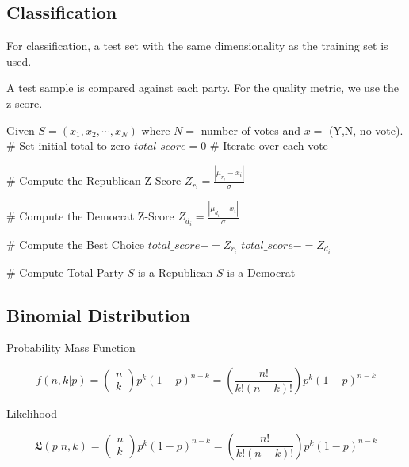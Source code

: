 \documentclass[12pt]{report}
\begin{document}
\clearpage
\subsection*{Classification}

For classification, a test set with the same dimensionality as the training set is used.

A test sample is compared against each party.  For the quality metric, we use the z-score.


\begin{algorithmic}
\State
\State Given $S = \left( x_1, x_2, \cdots, x_N \right)$ where $N = $ number of votes and $x = $ (Y,N, no-vote).
\State
\State \# Set initial total to zero
\State $total\_score = 0$
\State
\State \# Iterate over each vote
    
    \State
    \State \# Compute the Republican Z-Score
    \State $Z_{r_i} = \frac{\left|\mu_{r_i} - x_i\right|}{\sigma}$
    
    \State
    \State \# Compute the Democrat Z-Score
    \State $Z_{d_i} = \frac{\left|\mu_{d_i} - x_i\right|}{\sigma}$
    \State

    \State \# Compute the Best Choice
        \State $total\_score += Z_{r_i}$
    \Else
        \State $total\_score -= Z_{d_i}$
    \EndIf


\EndFor
\State
\State \# Compute Total Party
    \State $S$ is a Republican
\Else
    \State $S$ is a Democrat
\EndIf

\end{algorithmic}

\clearpage
\subsection*{Binomial Distribution}


Probability Mass Function

\begin{equation}
f(n,k | p) = \begin{pmatrix}
n\\k
\end{pmatrix} p^k (1-p)^{n-k} =\left( \frac{n!}{k!(n-k)!}\right) p^k (1-p)^{n-k}
\end{equation}

Likelihood

\begin{equation}
\mathfrak{L}(p|n,k) = \begin{pmatrix}
n\\k
\end{pmatrix} p^k (1-p)^{n-k} =\left( \frac{n!}{k!(n-k)!}\right) p^k (1-p)^{n-k}
\end{equation}
\end{document}
